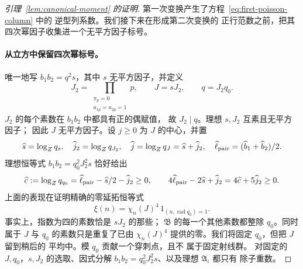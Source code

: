\documentclass[11pt,a4paper]{article}
\numberwithin{equation}{section}
\numberwithin{figure}{section}
\theoremstyle{definition}
\theoremstyle{remark}
\begin{document}
\begin{proof}[引理~\ref{lem:canonical-moment} 的证明]
第一次变换产生了方程~\eqref{eq:first-poisson-column} 中的
逆型列系数。我们接下来在形成第二次变换的
正行范数之前，把其四次幂因子收集进一个无平方因子标号。

\paragraph{从立方中保留四次幂标号。}
唯一地写 \(b_1b_2=q^2s\)，其中 \(s\) 无平方因子，并定义
\[
 J_2=\prod_{\substack{\pi_p=0\\a_{1p}=a_{2p}=1}}p,\qquad
 J=sJ_2,\qquad q=J_2q_0.
\]
\(J_2\) 的每个素数在 \(b_1b_2\) 中都具有正的偶赋值，
故 \(J_2\mid q\)。理想 \(s,J_2\) 互素且无平方因子；
因此 \(J\) 无平方因子。设 \(j\ge0\) 为 \(J\) 的中心，并置
\[
 \widehat s=\log_Zq_s,\quad \widehat j_2=\log_Zq_{J_2},\quad
 \widehat j=\log_Zq_J=\widehat s+\widehat j_2,\quad
 \widehat\ell_{\rm pair}=(\widehat b_1+\widehat b_2)/2.
\]
理想恒等式 \(b_1b_2=q_0^2J_2^2s\) 恰好给出
\begin{equation}\label{eq:inverse-cube-actual}
 \widehat c:=\log_Zq_{q_0}
   =\widehat\ell_{\rm pair}-\widehat s/2-\widehat j_2\ge0,
 \qquad
 4\widehat\ell_{\rm pair}-2\widehat s+\widehat j_2
   =4\widehat c+5\widehat j_2\ge0.
\end{equation}
上面的表现在证明精确的零延拓恒等式
\begin{equation}\label{eq:retained-cube-label}
 \xi(n)=\chi_n(J)^4\,1_{(n,\operatorname{rad}q_0)=1}.
\end{equation}
事实上，指数为四的素数恰是 \(sJ_2\) 的那些；
\(\mathfrak B\) 的每一个其他素数都整除 \(q_0\)。同时属于
\(J\) 与 \(q_0\) 的素数只是重复了已由
\(\chi_n(J)^4\) 提供的零。我们将固定 \(q_0\)，但把 \(J\) 留到稍后的
平均中。模 \(q_0\) 贡献一个穿刺点，且不
属于固定射线群。
对固定的 \(J,q_0\)，\(s,J_2\) 的选取、因式分解
\(b_1b_2=q_0^2J_2^2s\)、以及理想 \(\mathfrak A_i\) 都只有
除子重数。


\end{proof}
\end{document}
